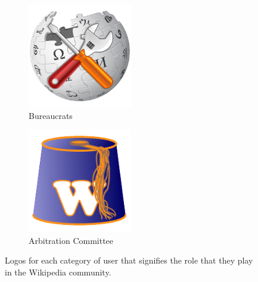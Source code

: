 \begin{figure}[h!]
    \begin{subfigure}[b]{0.49\textwidth}
        \centering
        \includegraphics[width=0.5\textwidth]{images/bureaucrat.png}
        \caption{Bureaucrats}
        \label{fig:crats}
    \end{subfigure}
    \begin{subfigure}[b]{0.49\textwidth}
        \centering
        \includegraphics[width=0.5\textwidth]{images/arbs.png}
        \caption{Arbitration Committee}
        \label{fig:arbs}
    \end{subfigure}
    \caption{Logos for each category of user that signifies the role that they play in the Wikipedia community.}
    \label{fig:logos}
\end{figure}

